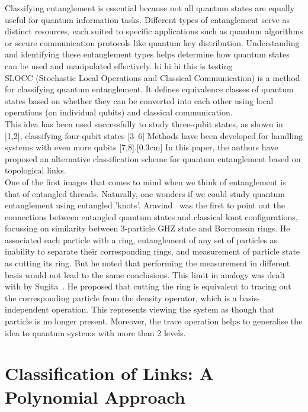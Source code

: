 \documentclass{scrartcl}
\begin{document}
Classifying entanglement is essential because not all quantum states are equally useful for quantum information tasks. Different types of entanglement serve as distinct resources, each suited to specific applications such as quantum algorithms or secure communication protocols like quantum key distribution. Understanding and identifying these entanglement types helps determine how quantum states can be used and manipulated effectively. hi hi hi this is testing\\[0.3cm]
SLOCC (Stochastic Local Operations and Classical Communication) is a method for classifying quantum entanglement. It defines equivalence classes of quantum states based on whether they can be converted into each other using local operations (on individual qubits) and classical communication.\\[0.3cm]
This idea has been used successfully to study three-qubit states, as shown in [1,2], classifying four-qubit states [3–6] Methods have been developed for handling systems with even more qubits [7,8].[0.3cm]
In this paper, the authors have proposed an alternative classification scheme for quantum entanglement based on topological links.\\[0.3cm]
One of the first images that comes to mind when we think of entanglement is that of entangled threads. Naturally, one wonders if we could study quantum entanglement using entangled 'knots'. Aravind~\cite{Aravind1997} was the first to point out the connections between entangled quantum states and classical knot configurations, focussing on similarity between 3-particle GHZ state and Borromean rings. He associated each particle with a ring, entanglement of any set of particles as inability to separate their corresponding rings, and measurement of particle state as cutting its ring. But he noted that performing the measurement in different basis would not lead to the same conclusions. This limit in analogy was dealt with by Sugita~\cite{Sugita2007-ko}. He proposed that cutting the ring is equivalent to tracing out the corresponding particle from the density operator, which is a basis-independent operation. This represents viewing the system as though that particle is no longer present. Moreover, the trace operation helps to generalise the idea to quantum systems with more than 2 levels.  



\section{Classification of Links: A Polynomial Approach}
\end{document}
